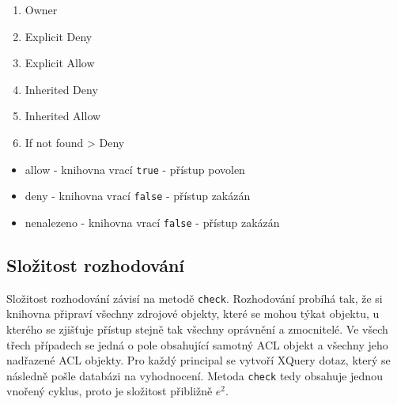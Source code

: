 \begin{enumerate}
\item Owner
\item Explicit Deny
\item Explicit Allow
\item Inherited Deny
\item Inherited Allow
\item If not found > Deny
\end{enumerate}

\begin{itemize}
\item allow - knihovna vrací \verb|true| - přístup povolen
\item deny - knihovna vrací \verb|false| - přístup zakázán
\item nenalezeno - knihovna vrací \verb|false| - přístup zakázán
\end{itemize}

\subsection{Složitost rozhodování}
Složitost rozhodování závisí na metodě \verb|check|. 
Rozhodování probíhá tak, že si knihovna připraví všechny zdrojové objekty, které se mohou týkat objektu, u kterého se zjišťuje přístup stejně tak všechny oprávnění a zmocnitelé. Ve všech třech případech se jedná o pole obsahující samotný ACL objekt a všechny jeho nadřazené ACL objekty. Pro každý principal se vytvoří XQuery dotaz, který se následně pošle databázi na vyhodnocení. Metoda \verb|check| tedy obsahuje jednou vnořený cyklus, proto je složitost přibližně $e^2$.
